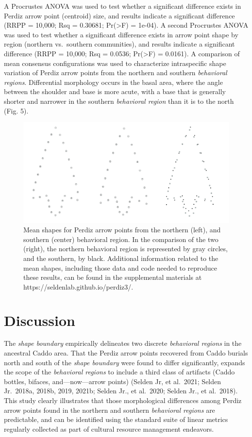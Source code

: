 \documentclass[smallextended]{svjour3}       %
\begin{document}
A Procrustes ANOVA was used to test whether a significant difference
exists in Perdiz arrow point (centroid) size, and results indicate a
significant difference (RRPP = 10,000; Rsq = 0.30681; Pr(\textgreater F)
= 1e-04). A second Procrustes ANOVA was used to test whether a
significant difference exists in arrow point shape by region (northern
vs.~southern communities), and results indicate a significant difference
(RRPP = 10,000; Rsq = 0.0536; Pr(\textgreater F) = 0.0161). A comparison
of mean consensus configurations was used to characterize intraspecific
shape variation of Perdiz arrow points from the northern and southern
\emph{behavioral regions}. Differential morphology occurs in the basal
area, where the angle between the shoulder and base is more acute, with
a base that is generally shorter and narrower in the southern
\emph{behavioral region} than it is to the north (Fig. 5).

\begin{figure}
\includegraphics[width=1\linewidth]{ms-figs/figure5} \caption{Mean shapes for Perdiz arrow points from the northern (left), and southern (center) behavioral region. In the comparison of the two (right), the northern behavioral region is represented by gray circles, and the southern, by black. Additional information related to the mean shapes, including those data and code needed to reproduce these results, can be found in the supplemental materials at https://seldenlab.github.io/perdiz3/.}\label{fig:fig5}
\end{figure}

\hypertarget{discussion}{%
\section{Discussion}\label{discussion}}

The \emph{shape boundary} empirically delineates two discrete
\emph{behavioral regions} in the ancestral Caddo area. That the Perdiz
arrow points recovered from Caddo burials north and south of the
\emph{shape boundary} were found to differ significantly, expands the
scope of the \emph{behavioral regions} to include a third class of
artifacts (Caddo bottles, bifaces, and---now---arrow points) (Selden Jr,
et al.~2021; Selden Jr.~2018a, 2018b, 2019, 2021b; Selden Jr., et
al.~2020; Selden Jr., et al.~2018). This study clearly illustrates that
those morphological differences among Perdiz arrow points found in the
northern and southern \emph{behavioral regions} are predictable, and can
be identified using the standard suite of linear metrics regularly
collected as part of cultural resource management endeavors.
\end{document}
